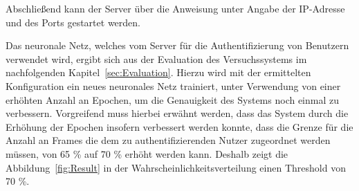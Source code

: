 Abschließend kann der Server über die Anweisung  unter Angabe der IP-Adresse und des Ports gestartet werden.

Das neuronale Netz, welches vom Server für die Authentifizierung von Benutzern verwendet wird, ergibt sich aus der Evaluation des Versuchssystems im nachfolgenden Kapitel~\ref{sec:Evaluation}.
Hierzu wird mit der ermittelten Konfiguration ein neues neuronales Netz trainiert, unter Verwendung von einer erhöhten Anzahl an Epochen, um die Genauigkeit des Systems noch einmal zu verbessern.
Vorgreifend muss hierbei erwähnt werden, dass das System durch die Erhöhung der Epochen insofern verbessert werden konnte, dass die Grenze für die Anzahl an Frames die dem zu authentifizierenden Nutzer zugeordnet werden müssen, von 65 \% auf 70 \% erhöht werden kann.
Deshalb zeigt die Abbildung~\ref{fig:Result} in der Wahrscheinlichkeitsverteilung einen Threshold von 70 \%.
